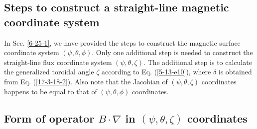 \documentclass{llncs}
\begin{document}
\subsection{Steps to construct a straight-line magnetic coordinate system}

In Sec. \ref{6-25-1}, we have provided the steps to construct the magnetic
surface coordinate system $(\psi, \theta, \phi)$. Only one additional step is
needed to construct the straight-line flux coordinate system $(\psi, \theta,
\zeta)$. The additional step is to calculate the generalized toroidal angle
$\zeta$ according to Eq. (\ref{5-13-e10}), where $\delta$ is obtained from Eq.
(\ref{17-3-18-2}). Also note that the Jacobian of $(\psi, \theta, \zeta)$
coordinates happens to be equal to that of $(\psi, \theta, \phi)$ coordinates.

\subsection{Form of operator $B \cdot \nabla$ in $(\psi, \theta, \zeta)$
coordinates}
\end{document}
